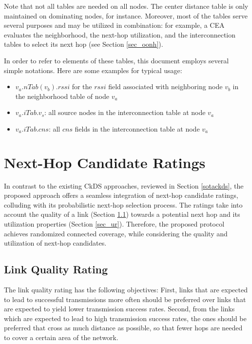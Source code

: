Note that not all tables are needed on all nodes. The center distance table is only maintained on dominating nodes, for instance. Moreover, most of the tables serve several purposes and may be utilized in combination: for example, a CEA evaluates the neighborhood, the next-hop utilization, and the interconnection tables to select its next hop (see Section \ref{sec_oonh}).


In order to refer to elements of these tables, this document employs several simple notations. Here are some examples for typical usage:

\begin{itemize}

		\item $v_a.nTab(v_b).rssi$ for the $rssi$ field associated with neighboring node $v_b$ in the neighborhood table of node $v_a$
		
		\item $v_a.iTab.v_s$: all source nodes in the interconnection table at node $v_a$
		
		\item $v_a.iTab.cns$: all $cns$ fields in the interconnection table at node $v_a$
		
\end{itemize}

\section{Next-Hop Candidate Ratings}\label{slr}\label{sec_nhcr}

In contrast to the existing CkDS approaches, reviewed in Section \ref{sotackds}, the proposed approach offers a seamless integration of next-hop candidate ratings, colluding with its probabilistic next-hop selection process. The ratings take into account the quality of a link (Section \ref{sec_lqr}) towards a potential next hop and its utilization properties (Section \ref{sec_ur}). Therefore, the proposed protocol achieves randomized connected coverage, while considering the quality and utilization of next-hop candidates. 


\subsection{Link Quality Rating} \label{sec_lqr}

The link quality rating has the following objectives: First, links that are expected to lead to successful transmissions more often should be preferred over links that are expected to yield lower transmission success rates. Second, from the links which are expected to lead to high transmission success rates, the ones should be preferred that cross as much distance as possible, so that fewer hops are needed to cover a certain area of the network.



